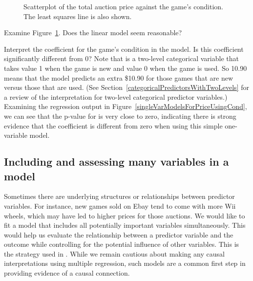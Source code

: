 \begin{figure}
  \centering
  \caption{Scatterplot of the total auction price against
      the game's condition.
      The least squares line is also shown.}
  \label{marioKartSingle}
\end{figure}

\begin{exercisewrap}
\begin{nexercise}
Examine Figure~\ref{marioKartSingle}. Does the linear model seem reasonable?\footnotemark
\end{nexercise}
\end{exercisewrap}

\begin{examplewrap}
\begin{nexample}{Interpret the coefficient for the game's condition in the model. Is this coefficient significantly different from 0?}
Note that  is a two-level categorical variable that takes value 1 when the game is new and value 0 when the game is used. So 10.90 means that the model predicts an extra \$10.90 for those games that are new versus those that are used. (See Section~\ref{categoricalPredictorsWithTwoLevels} for a review of the interpretation for two-level categorical predictor variables.) Examining the regression output in Figure~\ref{singleVarModelsForPriceUsingCond}, we can see that the p-value for  is very close to zero, indicating there is strong evidence that the coefficient is different from zero when using this simple one-variable model.
\end{nexample}
\end{examplewrap}

\subsection{Including and assessing many variables in a model}
\label{includingAndAssessingManyVariablesInAModel}

Sometimes there are underlying structures or relationships between predictor variables. For instance, new games sold on Ebay tend to come with more Wii wheels, which may have led to higher prices for those auctions. We would like to fit a model that includes all potentially important variables simultaneously. This would help us evaluate the relationship between a predictor variable and the outcome while controlling for the potential influence of other variables. This is the strategy used in . While we remain cautious about making any causal interpretations using multiple regression, such models are a common first step in providing evidence of a causal connection.

